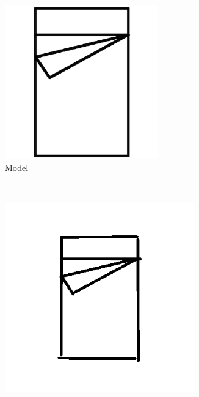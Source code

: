     \begin{figure}[h]
        \centering
                \begin{subfigure}[b]{0.2\textwidth}
                \centering
                \includegraphics[width=0.73\textwidth]{figures/Results/Sketches25f/Model.png}
                \caption{Model}
        \end{subfigure}\\
                \begin{subfigure}[b]{0.25\textwidth}
                \centering
                \includegraphics[width=0.9\textwidth]{figures/Results/Sketches25f/level1.png}

\end{subfigure}
\end{figure}
